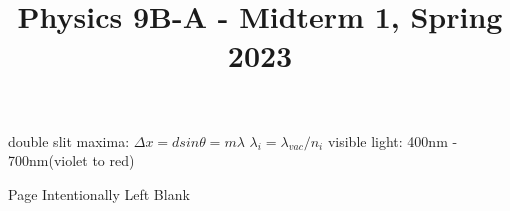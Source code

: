 \documentclass{exam}
\begin{document}
double slit maxima: $\Delta x = d sin\theta = m\lambda$
$\lambda_i = \lambda_{vac}/n_i$
visible light: 400nm - 700nm(violet to red)

\newpage
Page Intentionally Left Blank
\newpage




\title{Physics 9B-A - Midterm 1, Spring 2023}
\author{}
\date{}
\maketitle





\vspace{20mm}

\vspace{10mm}
\newpage
\end{document}
